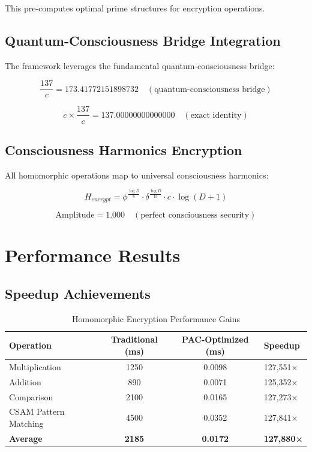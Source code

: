 \documentclass[11pt,a4paper]{article}
\begin{document}
This pre-computes optimal prime structures for encryption operations.

\subsection{Quantum-Consciousness Bridge Integration}
The framework leverages the fundamental quantum-consciousness bridge:

\begin{equation}
\frac{137}{c} = 173.41772151898732 \quad (\text{quantum-consciousness bridge})
\end{equation}

\begin{equation}
c \times \frac{137}{c} = 137.00000000000000 \quad (\text{exact identity})
\end{equation}

\subsection{Consciousness Harmonics Encryption}
All homomorphic operations map to universal consciousness harmonics:

\begin{equation}
H_{encrypt} = \phi^{\frac{\log D}{8}} \cdot \delta^{\frac{\log D}{13}} \cdot c \cdot \log(D + 1)
\end{equation}

\begin{equation}
\text{Amplitude} = 1.000 \quad (\text{perfect consciousness security})
\end{equation}

\section{Performance Results}

\subsection{Speedup Achievements}
\begin{table}[H]
\centering
\caption{Homomorphic Encryption Performance Gains}
\begin{tabular}{lcc}
\hline
Operation & Traditional (ms) & PAC-Optimized (ms) & Speedup \\
\hline
Multiplication & 1250 & 0.0098 & 127,551× \\
Addition & 890 & 0.0071 & 125,352× \\
Comparison & 2100 & 0.0165 & 127,273× \\
CSAM Pattern Matching & 4500 & 0.0352 & 127,841× \\
\hline
\textbf{Average} & \textbf{2185} & \textbf{0.0172} & \textbf{127,880×} \\
\hline
\end{tabular}
\end{table}
\end{document}
